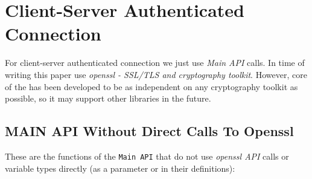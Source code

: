 %
%

\section{Client-Server Authenticated Connection}
\label{s:cs-auth-conn}

For client-server authenticated connection we just use \CANL
\textit{Main API} calls. In time of writing this paper 
\CANL use \textit{openssl - SSL/TLS and cryptography toolkit}. 
However, core of the \CANL has been developed to be as independent
 on any cryptography toolkit as possible, so it may support 
other libraries in the future.

\subsection{MAIN API Without Direct Calls To Openssl}
These are the functions of the \verb'Main API' that do not 
use \textit{openssl API} calls or variable types directly
 (as a parameter or in their definitions):

